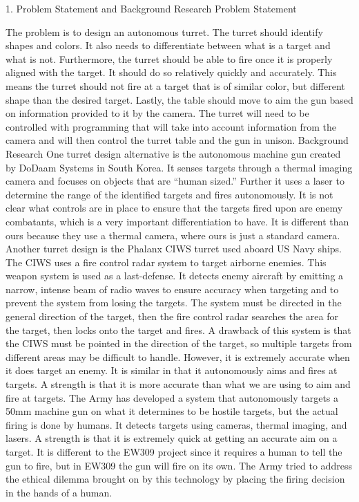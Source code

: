 
    1. Problem Statement and Background Research
	Problem Statement

The problem is to design an autonomous turret. The turret should identify shapes and colors. It also needs to differentiate between what is a target and what is not. Furthermore, the turret should be able to fire once it is properly aligned with the target. It should do so relatively quickly and accurately. This means the turret should not fire at a target that is of similar color, but different shape than the desired target. Lastly, the table should move to aim the gun based on information provided to it by the camera. The turret will need to be controlled with programming that will take into account information from the camera and will then control the turret table and the gun in unison. 
Background Research
One turret design alternative is the autonomous machine gun created by DoDaam Systems in South Korea. It senses targets through a thermal imaging camera and focuses on objects that are “human sized.” Further it uses a laser to determine the range of the identified targets and fires autonomously. It is not clear what controls are in place to ensure that the targets fired upon are enemy combatants, which is a very important differentiation to have. It is different than ours because they use a thermal camera, where ours is just a standard camera.
Another turret design is the Phalanx CIWS turret used aboard US Navy ships. The CIWS uses a fire control radar system to target airborne enemies. This weapon system is used as a last-defense. It detects enemy aircraft by emitting a narrow, intense beam of radio waves to ensure accuracy when targeting and to prevent the system from losing the targets. The system must be directed in the general direction of the target, then the fire control radar searches the area for the target, then locks onto the target and fires. A drawback of this system is that the CIWS must be pointed in the direction of the target, so multiple targets from different areas may be difficult to handle. However, it is extremely accurate when it does target an enemy. It is similar in that it autonomously aims and fires at targets. A strength is that it is more accurate than what we are using to aim and fire at targets.
The Army has developed a system that autonomously targets a 50mm machine gun on what it determines to be hostile targets, but the actual firing is done by humans. It detects targets using cameras, thermal imaging, and lasers. A strength is that it is extremely quick at getting an accurate aim on a target. It is different to the EW309 project since it requires a human to tell the gun to fire, but in EW309 the gun will fire on its own. The Army tried to address the ethical dilemma brought on by this technology by placing the firing decision in the hands of a human.

